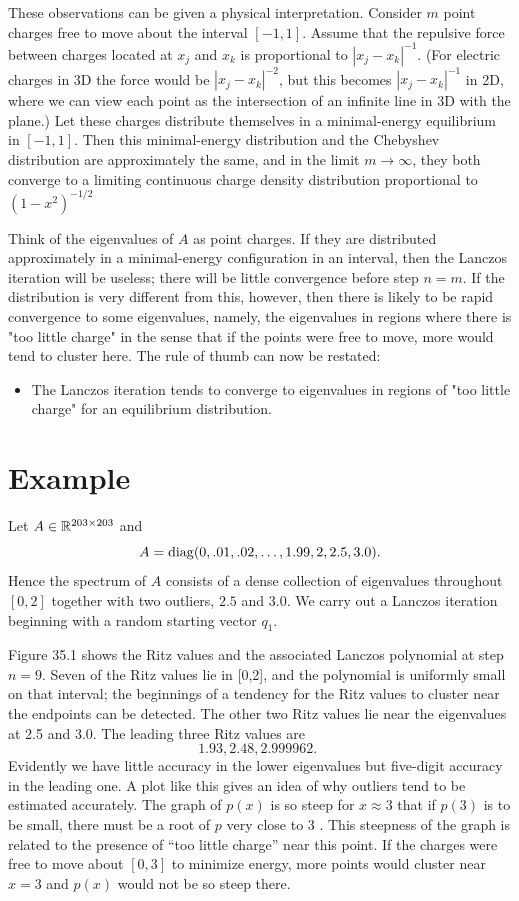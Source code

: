 These observations can be given a physical interpretation. Consider $m$ point charges free to move about the interval $[-1,1]$. Assume that the repulsive force between charges located at $x_j$ and $x_k$ is proportional to $\left|x_j-x_k\right|^{-1}$. (For electric charges in 3D the force would be $\left|x_j-x_k\right|^{-2}$, but this becomes $\left|x_j-x_k\right|^{-1}$ in 2D, where we can view each point as the intersection of an infinite line in 3D with the plane.) Let these charges distribute themselves in a minimal-energy equilibrium in $[-1,1]$. Then this minimal-energy distribution and the Chebyshev distribution are approximately the same, and in the limit $m \rightarrow \infty$, they both converge to a limiting continuous charge density distribution proportional to $\left(1-x^2\right)^{-1 / 2}$

Think of the eigenvalues of $A$ as point charges. If they are distributed approximately in a minimal-energy configuration in an interval, then the Lanczos iteration will be useless; there will be little convergence before step $n=m$. If the distribution is very different from this, however, then there is likely to be rapid convergence to some eigenvalues, namely, the eigenvalues in regions where there is "too little charge" in the sense that if the points were free to move, more would tend to cluster here. The rule of thumb can now be restated:

\begin{itemize}
    \item The Lanczos iteration tends to converge to eigenvalues in regions of "too little charge" for an equilibrium distribution.
\end{itemize}

\section{Example} 
Let $ A\in \mathbb{R}^{203\times 203} $ and 
\[
    A = {\rm diag}(0, .01, .02, \ldots , 1.99, 2, 2.5, 3.0). 
\] 
Hence the spectrum of $ A $ consists of a dense collection of eigenvalues throughout $ [0,2] $ together with two outliers, $ 2.5 $ and $ 3.0 $. We carry out a Lanczos iteration beginning with a random starting vector $ q_1 $. 


Figure 35.1 shows the Ritz values and the associated Lanczos polynomial at step $n=9$. Seven of the Ritz values lie in [0,2], and the polynomial is uniformly small on that interval; the beginnings of a tendency for the Ritz values to cluster near the endpoints can be detected. The other two Ritz values lie near the eigenvalues at 2.5 and 3.0. The leading three Ritz values are
$$
1.93,2.48,2.999962 \text {. }
$$
Evidently we have little accuracy in the lower eigenvalues but five-digit accuracy in the leading one. A plot like this gives an idea of why outliers tend to be estimated accurately. The graph of $p(x)$ is so steep for $x \approx 3$ that if $p(3)$ is to be small, there must be a root of $p$ very close to 3 . This steepness of the graph is related to the presence of ``too little charge'' near this point. If the charges were free to move about $ [0,3] $ to minimize energy, more points would cluster near $ x=3 $ and $ p(x) $ would not be so steep there. 

